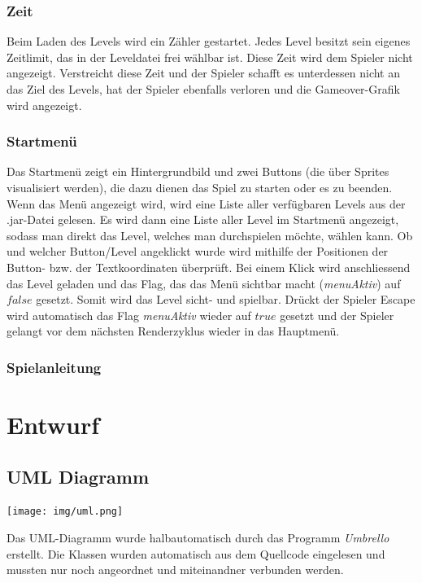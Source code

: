 \documentclass[12pt,a4paper]{scrartcl}
\newcommand{\inmilestonetwo}{\vspace{0.75cm} \framebox[1.1\width]{
\begin{large}
\textcolor{red}{Die Dokumentation dieses Abschnittes ist für Milestone II vorgesehen.}
\end{large}}}
\begin{document}
\subsubsection{Zeit}
Beim Laden des Levels wird ein Zähler gestartet. Jedes Level besitzt sein eigenes Zeitlimit, das in der Leveldatei frei wählbar ist.
Diese Zeit wird dem Spieler nicht angezeigt. Verstreicht diese Zeit und der Spieler schafft es unterdessen nicht an das Ziel des Levels,
hat der Spieler ebenfalls verloren und die Gameover-Grafik wird angezeigt.

\subsubsection{Startmenü}
Das Startmenü zeigt ein Hintergrundbild und zwei Buttons (die über Sprites visualisiert werden), die dazu dienen das Spiel zu starten oder es zu beenden.
Wenn das Menü angezeigt wird, wird eine Liste aller verfügbaren Levels aus der .jar-Datei gelesen. Es wird dann eine
Liste aller Level im Startmenü angezeigt, sodass man direkt das Level, welches man durchspielen möchte, wählen kann.
Ob und welcher Button/Level angeklickt wurde wird mithilfe der Positionen der Button- bzw. der Textkoordinaten überprüft.
Bei einem Klick wird anschliessend das Level geladen und das Flag, das das Menü sichtbar macht (\textit{menuAktiv}) auf $false$
gesetzt. Somit wird das Level sicht- und spielbar. Drückt der Spieler Escape wird automatisch das Flag \textit{menuAktiv} wieder auf $true$
gesetzt und der Spieler gelangt vor dem nächsten Renderzyklus wieder in das Hauptmenü.

\subsubsection{Spielanleitung}
\inmilestonetwo

\clearpage
\newpage
\section{Entwurf}
\subsection{UML Diagramm}
\vspace{0.3cm}
\texttt{[image: img/uml.png]}

Das UML-Diagramm wurde halbautomatisch durch das Programm \textit{Umbrello} erstellt. Die Klassen
wurden automatisch aus dem Quellcode eingelesen und mussten nur noch angeordnet und miteinandner verbunden
werden.\\
\end{document}
